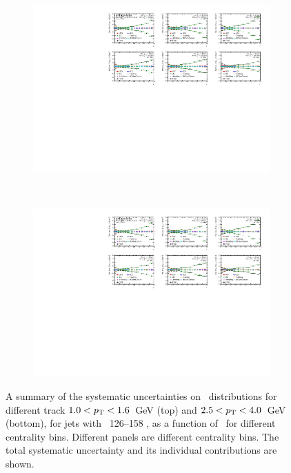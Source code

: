 \begin{figure}
\centering
\begin{subfigure}[b]{\textwidth}
    \centering
    \includegraphics[page=1, width=\textwidth]{figures/main/systematics/Summary_ChPS_dR_sys_PbPb_error}
    \caption{}
    \label{fig:rdptr_sys_uncert1a}
\end{subfigure} \\
\begin{subfigure}[b]{\textwidth}
    \centering
    \includegraphics[page=3, width=\textwidth]{figures/main/systematics/Summary_ChPS_dR_sys_PbPb_error}
    \caption{}
    \label{fig:rdptr_sys_uncert1b}
\end{subfigure}\hfill
   \caption{A summary of the systematic uncertainties on \RDptr\ distributions for different track \mbox{$1.0 < \mbox{$p_{\mathrm{T}}$} < 1.6$ GeV} (top) and \mbox{$2.5 < \mbox{$p_{\mathrm{T}}$} < 4.0$ GeV} (bottom), for jets with \pt\ 126--158 \GeV, as a function of \rvar\ for different centrality bins.
Different panels are different centrality bins.
The total systematic uncertainty and its individual contributions are shown.}
\label{fig:rdptr_sys_uncert1}
\end{figure}


